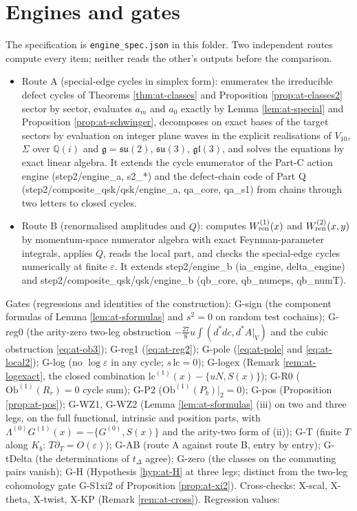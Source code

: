 \documentclass[11pt]{article}
\numberwithin{equation}{section}
\theoremstyle{plain}
\theoremstyle{definition}
\newcommand{\AV}{A|_V}
\newcommand{\Ob}{\mathrm{Ob}}
\newcommand{\lc}{\mathrm{lc}}
\begin{document}
\section{Engines and gates}
\label{sec:at-engines}

The specification is \texttt{engine\_spec.json} in this folder. Two independent routes compute every item; neither reads the other's outputs before the comparison.
\begin{itemize}
\item Route A (special-edge cycles in simplex form): enumerates the irreducible defect cycles of Theorems \ref{thm:at-classes} and Proposition \ref{prop:at-classes2} sector by sector, evaluates $a_m$ and $a_0$ exactly by Lemma \ref{lem:at-special} and Proposition \ref{prop:at-schwinger}, decomposes on exact bases of the target sectors by evaluation on integer plane waves in the explicit realisations of $V_{10}$, $\Sigma$ over $\mathbb Q(i)$ and $\mathfrak g=\mathfrak{su}(2)$, $\mathfrak{su}(3)$, $\mathfrak{gl}(3)$, and solves the equations by exact linear algebra. It extends the cycle enumerator of the Part-C action engine (step2/engine\_a, s2\_*) and the defect-chain code of Part Q (step2/composite\_qsk/qsk/engine\_a, qa\_core, qa\_s1) from chains through two letters to closed cycles.
\item Route B (renormalised amplitudes and $Q$): computes $W^{(1)}_{\rm ren}(x)$ and $W^{(2)}_{\rm ren}(x,y)$ by momentum-space numerator algebra with exact Feynman-parameter integrals, applies $Q$, reads the local part, and checks the special-edge cycles numerically at finite $\varepsilon$. It extends step2/engine\_b (ia\_engine, delta\_engine) and step2/composite\_qsk/qsk/engine\_b (qb\_core, qb\_numeps, qb\_numT).
\end{itemize}
Gates (regressions and identities of the construction): G-sign (the component formulas of Lemma \ref{lem:at-sformulas} and $s^2=0$ on random test cochains); G-reg0 (the arity-zero two-leg obstruction $-\tfrac{27}8u\int(d^*dc,d^*\AV)$ and the cubic obstruction \eqref{eq:at-ob3}); G-reg1 (\eqref{eq:at-reg2}); G-pole (\eqref{eq:at-pole} and \eqref{eq:at-local2}); G-log (no $\log\varepsilon$ in any cycle; $s\,\lc=0$); G-logex (Remark \ref{rem:at-logexact}, the closed combination $\lc^{(1)}(x)-\{uN,S(x)\}$); G-R0 ($\Ob^{(1)}(R_r)=0$ cycle sum); G-P2 ($\Ob^{(1)}(P_b)|_2=0$); G-pos (Proposition \ref{prop:at-pos}); G-WZ1, G-WZ2 (Lemma \ref{lem:at-sformulas} (iii) on two and three legs, on the full functional, intrinsic and position parts, with $\Lambda^{(0)}G^{(1)}(x)=-\{G^{(0)},S(x)\}$ and the arity-two form of (ii)); G-T (finite $T$ along $K_b$: $T\partial_T=O(\varepsilon)$); G-AB (route A against route B, entry by entry); G-tDelta (the determinations of $t_\Delta$ agree); G-zero (the classes on the commuting pairs vanish); G-H (Hypothesis \ref{hyp:at-H} at three legs; distinct from the two-leg cohomology gate G-S1xi2 of Proposition \ref{prop:at-xi2}). Cross-checks: X-scal, X-theta, X-twist, X-KP (Remark \ref{rem:at-cross}). Regression values:
\end{document}
